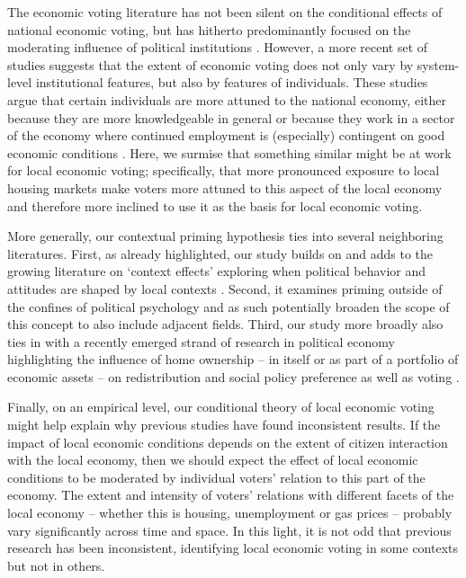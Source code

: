 \documentclass[12pt,a4paper]{article}
\begin{document}
	The economic voting literature has not been silent on the conditional effects of national economic voting, but has hitherto predominantly focused on the moderating influence of political institutions \cite[cf.]{powell1993cross, duch2008economic}. However, a more recent set of studies suggests that the extent of economic voting does not only vary by system-level institutional features, but also by features of individuals. These studies argue that certain individuals are more attuned to the national economy, either because they are more knowledgeable in general \citep{vries2014holding} or because they work in a sector of the economy where continued employment is (especially) contingent on good economic conditions \citep{singer2011says, singer2011voters,singer2013goes, fossati2014economic}. Here, we surmise that something similar might be at work for local economic voting; specifically, that more pronounced exposure to local housing markets make voters more attuned to this aspect of the local economy and therefore more inclined to use it as the basis for local economic voting.
	
	More generally, our contextual priming hypothesis ties into several neighboring literatures. First, as already highlighted, our study builds on and adds to the growing literature on `context effects' exploring when political behavior and attitudes are shaped by local contexts \citep[e.g.,][]{hopkins2010politicized,danckert2017reacting}. Second, it examines priming outside of the confines of political psychology and as such potentially broaden the scope of this concept to also include adjacent fields. Third, our study more broadly also ties in with a recently emerged strand of research in political economy highlighting the influence of home ownership -- in itself or as part of a portfolio of economic assets -- on redistribution and social policy preference as well as voting \citep{ansell2014political,nadeau2010patrimonial,stubager2013reaching}. 
	
	Finally, on an empirical level, our conditional theory of local economic voting might help explain why previous studies have found inconsistent results. If the impact of local economic conditions depends on the extent of citizen interaction with the local economy, then we should expect the effect of local economic conditions to be moderated by individual voters’ relation to this part of the economy. The extent and intensity of voters’ relations  with different facets of the local economy – whether this is housing, unemployment or gas prices – probably vary significantly across time and space. In this light, it is not odd that previous research has been inconsistent, identifying local economic voting in some contexts but not in others.
	
\end{document}
